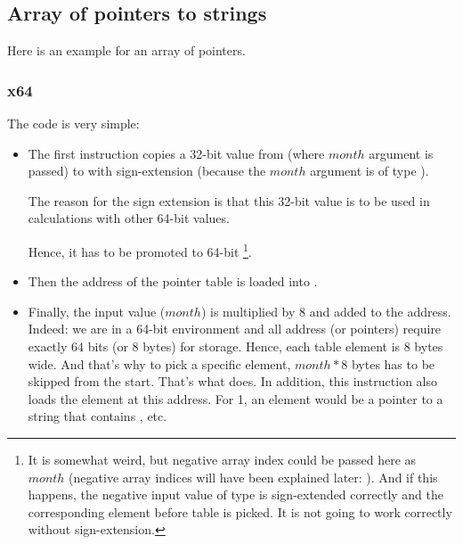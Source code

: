 ﻿\subsection{Array of pointers to strings}
\label{array_of_pointers_to_strings}

Here is an example for an array of pointers.



\subsubsection{x64}



The code is very simple:

\begin{itemize}

\item
{}

The first  instruction copies a 32-bit value from \ECX (where $month$ argument is passed) 
to \RAX with sign-extension (because the $month$ argument is of type \Tint).

The reason for the sign extension is that this 32-bit value is to be used in calculations
with other 64-bit values.

Hence, it has to be promoted to 64-bit%
\footnote{It is somewhat weird, but negative array index could be passed here as $month$
(negative array indices will have been explained later: ).
And if this happens, the negative input value of \Tint type is sign-extended correctly 
and the corresponding element before table is picked. 
It is not going to work correctly without sign-extension.}.

\item
Then the address of the pointer table is loaded into \RCX.

\item
Finally, the input value ($month$) is multiplied by 8 and added to the address.
Indeed: we are in a 64-bit environment and all address (or pointers) require exactly 64 bits (or 8 bytes) 
for storage.
Hence, each table element is 8 bytes wide.
And that's why to pick a specific element, $month*8$ bytes has to be skipped from the start.
That's what \MOV does.
In addition, this instruction also loads the element at this address.
For 1, an element would be a pointer to a string that contains , etc.

\end{itemize}

